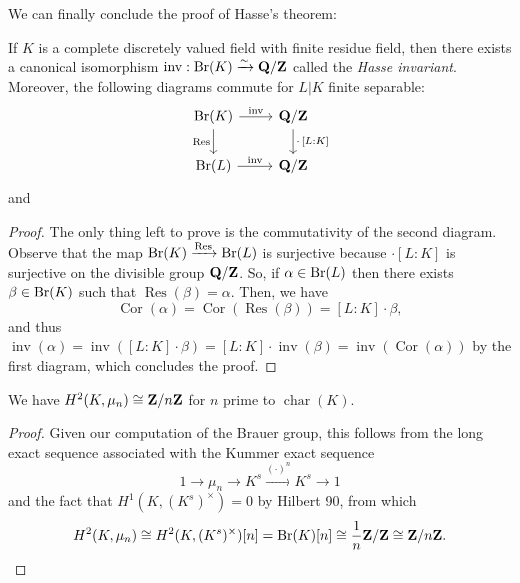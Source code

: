 \documentclass{article}
\begin{document}
We can finally conclude the proof of Hasse's theorem:
\begin{thm}[Hasse]
		If $K$ is a complete discretely valued field with finite residue field, then there exists a canonical isomorphism $\operatorname{inv}:\text{Br}(K)\xrightarrow{\sim} \mathbf{Q}/\mathbf{Z}$ called the \emph{Hasse invariant}. Moreover, the following diagrams commute for $L|K$ finite separable:
		\[
			\begin{tikzcd}
				\Br(K) \arrow[r, "\operatorname{inv}"] \arrow[d, "\operatorname{Res}"'] & \Q/\Z \arrow[d, "\cdot\,\lbrack L:K\rbrack"] \\
				\Br(L) \arrow[r, "\operatorname{inv}"] & \Q/\Z
			\end{tikzcd}
		\]
		and 
\end{thm}
\begin{proof}
		The only thing left to prove is the commutativity of the second diagram. Observe that the map $\text{Br}(K)\xrightarrow{\operatorname{Res}}\text{Br}(L)$ is surjective because $\cdot [L:K]$ is surjective on the divisible group $\mathbf{Q}/\mathbf{Z}$. So, if $\alpha\in\text{Br}(L)$ then there exists $\beta\in\text{Br}(K)$ such that $\operatorname{Res}(\beta)=\alpha$. Then, we have
		\[
		\operatorname{Cor}(\alpha)=\operatorname{Cor}(\operatorname{Res}(\beta))=[L:K]\cdot \beta,
		\]
		and thus $\operatorname{inv}(\alpha) = \operatorname{inv}([L:K]\cdot \beta) = [L:K]\cdot \operatorname{inv}(\beta) = \operatorname{inv}(\operatorname{Cor}(\alpha))$ by the first diagram, which concludes the proof.
\end{proof}
\begin{cor}
		We have $H^2(K,\mu_n)\cong \mathbf{Z}/n\mathbf{Z}$ for $n$ prime to $\operatorname{char}(K)$.
\end{cor}
\begin{proof}
		Given our computation of the Brauer group, this follows from the long exact sequence associated with the Kummer exact sequence
		\[
			1 \to \mu_n \to K^s \xrightarrow{(\cdot)^n} K^s \to 1
		\]
		and the fact that $H^1(K,(K^s)^\times)=0$ by Hilbert 90, from which $$H^2(K,\mu_n)\cong H^2(K,(K^s)^\times)[n] = \text{Br}(K)[n] \cong \frac{1}{n}\mathbf{Z}/\mathbf{Z} \cong  \mathbf{Z}/n\mathbf{Z}.$$
\end{proof}
\end{document}

